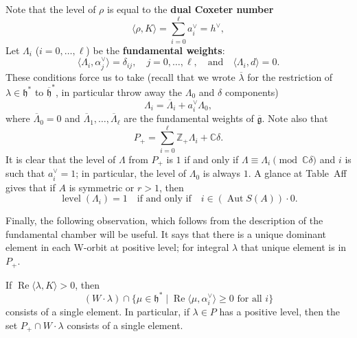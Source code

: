 \documentclass[12pt]{article}
\begin{document}
Note that the level of $\rho$ is equal to the \textbf{dual Coxeter number}
\begin{equation}\label{eq:12.4.2}
    \langle \rho, K \rangle = \sum_{i=0}^{\ell} a_i^{\vee} = h^{\vee},
\end{equation}
Let $\Lambda_i$ ($i = 0, \dots, \ell$) be the \textbf{fundamental weights}:
\[
\langle \Lambda_i, \alpha_j^{\vee} \rangle = \delta_{ij}, \quad j = 0, \dots, \ell, \quad \text{and} \quad \langle \Lambda_i, d \rangle = 0.
\]
These conditions force us to take (recall that we wrote $\overline{\lambda}$ for the restriction of $\lambda \in \mathfrak{h}^*$ to $\overline{\mathfrak{h}}^*$, in particular throw away the $\Lambda_0$ and $\delta$ components)
\begin{equation}\label{eq:12.4.3}
    \Lambda_i = \overline{\Lambda}_i + a_i^{\vee} \Lambda_0,
\end{equation}
where $\overline{\Lambda}_0 = 0$ and $\overline{\Lambda}_1, \dots, \overline{\Lambda}_\ell$ are the fundamental weights of $\overline{\mathfrak{g}}$. Note also that
\begin{equation}\label{eq:12.4.4}
    P_+ = \sum_{i=0}^{\ell} \mathbb{Z}_+ \Lambda_i + \mathbb{C}\delta.
\end{equation}
It is clear that the level of $\Lambda$ from $P_+$ is $1$ if and only if $\Lambda \equiv \Lambda_i \pmod{\mathbb{C}\delta}$ and $i$ is such that $a_i^{\vee} = 1$; in particular, the level of $\Lambda_0$ is always $1$. A glance at Table~Aff gives that if $A$ is symmetric or $r > 1$, then
\begin{equation}\label{eq:12.4.5}
    \operatorname{level}(\Lambda_i) = 1 \quad \text{if and only if} \quad i \in (\operatorname{Aut} S(A)) \cdot 0.
\end{equation}

Finally, the following observation, which follows from the description of the fundamental chamber will be useful. It says that there is a unique dominant element in each W-orbit at positive level; for integral $\lambda$ that unique element is in $P_+$.
\begin{lemma}[12.4]
If $\operatorname{Re}\langle \lambda, K \rangle > 0$, then
\[(W \cdot \lambda) \cap \{ \mu \in \mathfrak{h}^* \mid \operatorname{Re}\langle \mu, \alpha_i^\vee \rangle \ge 0 \text{ for all } i \}\]
consists of a single element. In particular, if $\lambda \in P$ has a positive level, then the set $P_+ \cap W \cdot \lambda$ consists of a single element.
\end{lemma}
\end{document}
